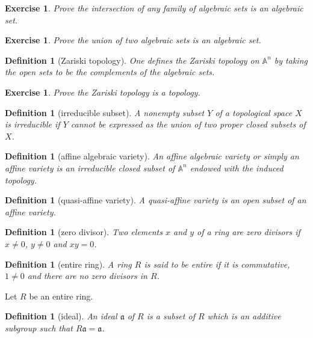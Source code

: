 \documentclass[12pt]{article}
\newtheorem{definition}[proposition]{Definition}
\newtheorem{ex}[proposition]{Exercise}
\begin{document}
\begin{ex}
	Prove the intersection of any family of algebraic sets is an algebraic set.
\end{ex}

\begin{ex}
	Prove the union of two algebraic sets is an algebraic set.
\end{ex}		

\begin{definition}[Zariski topology]
	One defines the Zariski topology on $\mathbb{A}^n$ by taking the open sets to be the complements of the algebraic sets.
\end{definition}

\begin{ex}
	Prove the Zariski topology is a topology. 
\end{ex}

\begin{definition}[irreducible subset]
	A nonempty subset $Y$ of a topological space $X$ is irreducible if $Y$ cannot be expressed as the union of two proper closed subsets of $X$. 
\end{definition}

\begin{definition}[affine algebraic variety]
	An affine algebraic variety or simply an affine variety is an irreducible closed subset of $\mathbb{A}^n$ endowed with the induced topology. 
\end{definition}

\begin{definition}[quasi-affine variety]
	A quasi-affine variety is an open subset of an affine variety. 
\end{definition}

\begin{definition}[zero divisor]
	Two elements $x$ and $y$ of a ring are zero divisors if $x \neq 0$, $y \neq 0$ and $x y = 0$.
\end{definition}

\begin{definition}[entire ring]
	A ring $R$ is said to be entire if it is commutative, $1 \neq 0$ and there are no zero divisors in $R$. 
\end{definition}

Let $R$ be an entire ring. 

\begin{definition}[ideal]
	An ideal $\mathfrak{a}$ of $R$ is a subset of $R$ which is an additive subgroup such that $R\mathfrak{a} = \mathfrak{a}$.
\end{definition}
\end{document}
